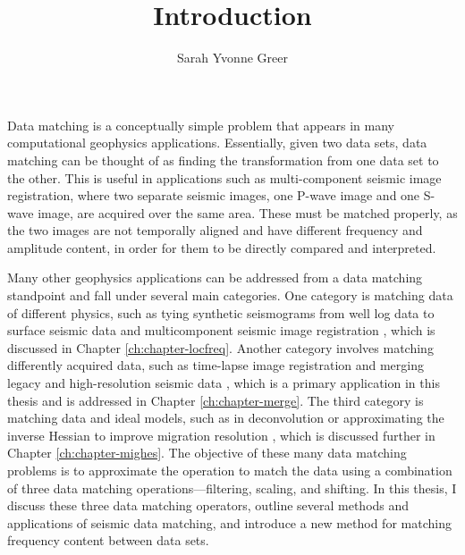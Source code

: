 \title{Introduction}
\author{Sarah Yvonne Greer}
\label{ch:chapter-intro}

\maketitle

Data matching is a conceptually simple problem that appears in many computational geophysics applications. 
Essentially, given two data sets, data matching can be thought of as finding the transformation from one data set to the other. 
This is useful in applications such as multi-component seismic image registration, where two separate seismic images, one P-wave image and one S- wave image, are acquired over the same area. 
These must be matched properly, as the two images are not temporally aligned and have different frequency and amplitude content, in order for them to be directly compared and interpreted. 

Many other geophysics applications can be addressed from a data matching standpoint and fall under several main categories.
One category is matching data of different physics, such as tying synthetic seismograms from well log data to surface seismic data \cite[]{herrera, bader} and multicomponent seismic image registration \cite[]{multi,warp,hardage}, which is discussed in Chapter \ref{ch:chapter-locfreq}.
Another category involves matching differently acquired data, such as time-lapse image registration \cite[]{timelapse} and merging legacy and high-resolution seismic data \cite[]{merge}, which is a primary application in this thesis and is addressed in Chapter \ref{ch:chapter-merge}.
The third category is matching data and ideal models, such as in deconvolution or approximating the inverse Hessian to improve migration resolution \cite[]{migdec,rtmmf,mighess}, which is discussed further in Chapter \ref{ch:chapter-mighes}.
The objective of these many data matching problems is to approximate the operation to match the data using a combination of three data matching operations---filtering, scaling, and shifting.
In this thesis, I discuss these three data matching operators, outline several methods and applications of seismic data matching, and introduce a new method for matching frequency content between data sets.

